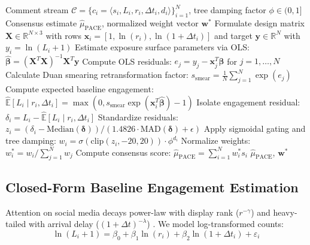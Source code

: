\documentclass[journal]{IEEEtran}
\begin{document}
\begin{algorithm}[t]
\caption{PACE: Preferential-Attachment Corrected Endorsement}
\label{alg:pace}
\begin{algorithmic}[1]
\REQUIRE Comment stream $\mathcal{C} = \{c_i = \langle s_i, L_i, r_i, \Delta t_i, d_i \rangle\}_{i=1}^N$, tree damping factor $\phi \in (0, 1]$
\ENSURE Consensus estimate $\hat{\mu}_{\text{PACE}}$, normalized weight vector $\mathbf{w}^*$
\STATE Formulate design matrix $\mathbf{X} \in \mathbb{R}^{N \times 3}$ with rows $\mathbf{x}_i = [1, \ln(r_i), \ln(1 + \Delta t_i)]$ and target $\mathbf{y} \in \mathbb{R}^N$ with $y_i = \ln(L_i + 1)$
\STATE Estimate exposure surface parameters via OLS: $\hat{\boldsymbol{\beta}} = (\mathbf{X}^T \mathbf{X})^{-1} \mathbf{X}^T \mathbf{y}$
\STATE Compute OLS residuals: $e_j = y_j - \mathbf{x}_j^T \hat{\boldsymbol{\beta}}$ for $j = 1, \dots, N$
\STATE Calculate Duan smearing retransformation factor: $s_{\text{smear}} = \frac{1}{N} \sum_{j=1}^N \exp(e_j)$
    \STATE Compute expected baseline engagement: $\hat{\mathbb{E}}[L_i \mid r_i, \Delta t_i] = \max\left(0, s_{\text{smear}} \exp(\mathbf{x}_i^T \hat{\boldsymbol{\beta}}) - 1\right)$
    \STATE Isolate engagement residual: $\delta_i = L_i - \hat{\mathbb{E}}[L_i \mid r_i, \Delta t_i]$
\ENDFOR
\STATE Standardize residuals: $z_i = (\delta_i - \text{Median}(\boldsymbol{\delta})) / (1.4826 \cdot \text{MAD}(\boldsymbol{\delta}) + \epsilon)$
    \STATE Apply sigmoidal gating and tree damping: $w_i = \sigma(\text{clip}(z_i, -20, 20)) \cdot \phi^{d_i}$
\ENDFOR
\STATE Normalize weights: $w_i^* = w_i / \sum_{j=1}^N w_j$
\STATE Compute consensus score: $\hat{\mu}_{\text{PACE}} = \sum_{i=1}^N w_i^* s_i$
\RETURN $\hat{\mu}_{\text{PACE}}$, $\mathbf{w}^*$
\end{algorithmic}
\end{algorithm}

\subsection{Closed-Form Baseline Engagement Estimation}
Attention on social media decays power-law with display rank ($r^{-\gamma}$) and heavy-tailed with arrival delay ($(1 + \Delta t)^{-\lambda}$) \cite{craswell2008experimental, wu2018beyond}. We model log-transformed counts:
\begin{equation}
\ln(L_i + 1) = \beta_0 + \beta_1 \ln(r_i) + \beta_2 \ln(1 + \Delta t_i) + \varepsilon_i
\end{equation}
\end{document}
